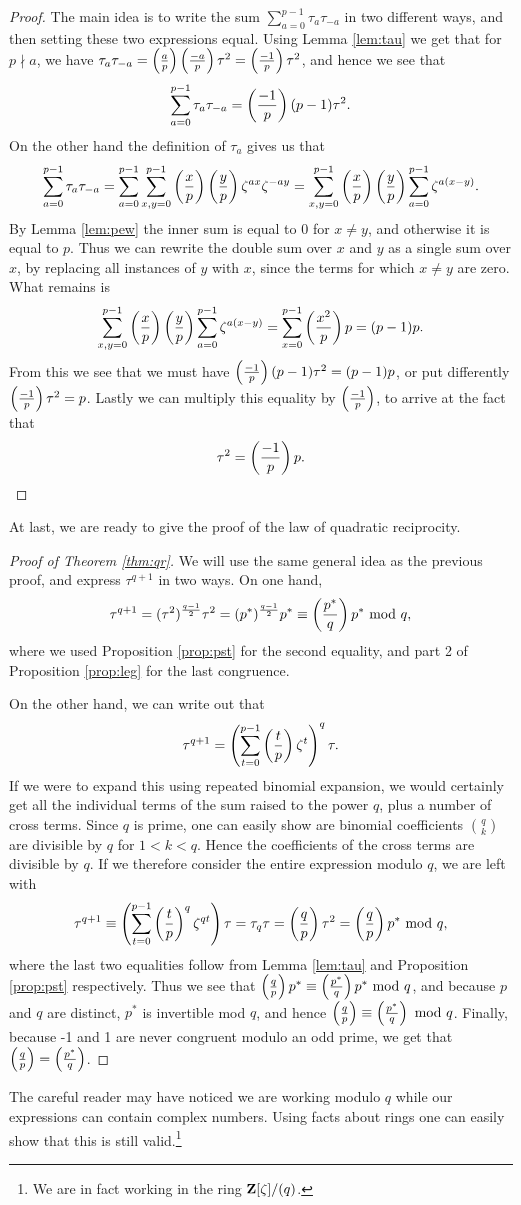 \documentclass[11pt]{amsart}
\begin{document}
\begin{proof}
The main idea is to write the sum $\sum_{a=0}^{p-1} \tau_a \tau_{-a}$ in two different ways, and then setting these two expressions equal. Using Lemma \ref{lem:tau} we get that for $p\nmid a$, we have $\tau_a \tau_{-a} = \leg ap \leg {-a}{p} \tau^2 = \leg {-1}{p} \tau^2$, and hence we see that
\[\sum_{a=0}^{p-1} \tau_a \tau_{-a} = \leg {-1}{p}(p-1) \tau^2. \]
On the other hand the definition of $\tau_a$ gives us that 
\[\sum_{a=0}^{p-1} \tau_a \tau_{-a} = \sum_{a=0}^{p-1} \sum_{x,y=0}^{p-1} \leg xp \leg yp \zeta^{ax}\zeta^{-ay} = \sum_{x,y=0}^{p-1} \leg{x}{p}\leg{y}{p} \sum_{a=0}^{p-1} \zeta^{a(x-y)}.\]
By Lemma \ref{lem:pew} the inner sum is equal to 0 for $x\neq y$, and otherwise it is equal to $p$. Thus we can rewrite the double sum over $x$ and $y$ as a single sum over $x$, by replacing all instances of $y$ with $x$, since the terms for which $x\neq y$ are zero. What remains is
\[\sum_{x,y=0}^{p-1} \leg{x}{p}\leg{y}{p} \sum_{a=0}^{p-1} \zeta^{a(x-y)}=\sum_{x=0}^{p-1} \leg{x^2}{p} p = (p-1)p.\]From this we see that we must have $ \leg {-1}{p}(p-1) \tau^2 = (p-1)p$, or put differently $\leg {-1}{p}\tau^2 = p$. Lastly we can multiply this equality by $\leg{-1}{p}$, to arrive at the fact that \[\tau^2 = \leg{-1}{p} p.\qedhere \]
\end{proof}

At last, we are ready to give the proof of the law of quadratic reciprocity.
\begin{proof}[Proof of Theorem \ref{thm:qr}]
We will use the same general idea as the previous proof, and express $\tau^{q+1}$ in two ways. On one hand, 
\[\tau^{q+1} = (\tau^2)^{\frac{q-1}{2}} \tau^2 = (p^*)^{\frac{q-1}{2}} p^* \equiv \leg{p^*}{q}p^* \mod q, \] where we used Proposition \ref{prop:pst} for the second equality, and part 2 of Proposition \ref{prop:leg} for the last congruence.

On the other hand, we can write out that
\[\tau^{q+1} = \left( \sum_{t=0}^{p-1} \leg tp \zeta^{t} \right)^q \tau. \]
If we were to expand this using repeated binomial expansion, we would certainly get all the individual terms of the sum raised to the power $q$, plus a number of cross terms. Since $q$ is prime, one can easily show are binomial coefficients $\binom{q}{k}$ are divisible by $q$ for $1<k<q$. Hence the coefficients of the cross terms are divisible by $q$. If we therefore consider the entire expression modulo $q$, we are left with 
\[\tau^{q+1} \equiv \left( \sum_{t=0}^{p-1} \leg{t}{p}^q \zeta^{qt} \right) \tau = \tau_q \tau=  \leg qp \tau^2 = \leg qp p^* \mod q ,\]
where the last two equalities follow from Lemma \ref{lem:tau} and Proposition \ref{prop:pst} respectively. Thus we see that $\leg qp p^* \equiv \leg{p^*}{q}p^* \mod q$, and because $p$ and $q$ are distinct, $p^*$ is invertible mod $q$, and hence $\leg qp \equiv \leg{p^*}{q} \mod q$. Finally, because -1 and 1 are never congruent   modulo an odd prime, we get that $\leg qp = \leg{p^*}{q}$.
\end{proof}
The careful reader may have noticed we are working modulo $q$ while our expressions can contain complex numbers. Using facts about rings one can easily show that this is still valid.\footnote{We are in fact working in the ring $\bf Z[\zeta]/(q)$.}
\end{document}
